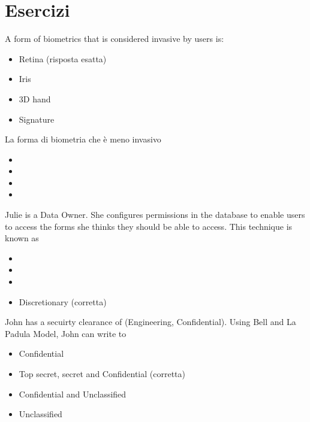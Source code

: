 \section{Esercizi}

A form of biometrics that is considered invasive by users is:
\begin{itemize}
 \item Retina (risposta esatta)
 \item Iris
 \item 3D hand
 \item Signature
\end{itemize}

La forma di biometria che è meno invasivo

\begin{itemize}
\item 
\item
\item
\item 
\end{itemize}

Julie is a Data Owner. She configures permissions in the database to enable 
users to access the forms she thinks they should be able to access. This 
technique is known as

\begin{itemize}
\item 
\item
\item
\item Discretionary (corretta)
\end{itemize}

John has a secuirty clearance of (Engineering, Confidential). Using Bell and La 
Padula Model, John can write to

\begin{itemize}
\item Confidential
\item Top secret, secret and Confidential (corretta)
\item Confidential and Unclassified
\item Unclassified
\end{itemize}